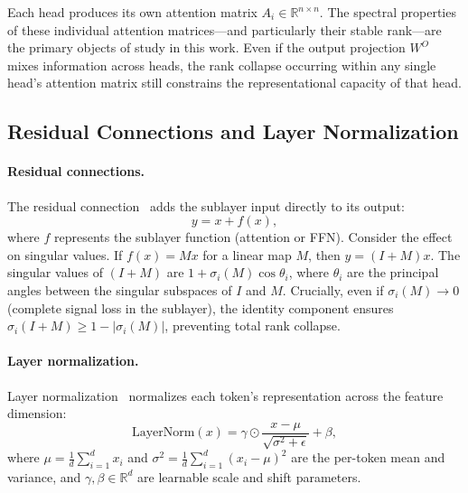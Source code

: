 \documentclass[12pt, a4paper]{article}
\begin{document}
Each head produces its own attention matrix $A_i \in
\mathbb{R}^{n \times n}$. The spectral properties of these individual
attention matrices---and particularly their stable rank---are the primary
objects of study in this work. Even if the output projection $W^O$ mixes
information across heads, the rank collapse occurring within any single
head's attention matrix still constrains the representational capacity of
that head.

\subsection{Residual Connections and Layer Normalization}

\paragraph{Residual connections.}
The residual connection~\cite{he2016residual} adds the sublayer input
directly to its output:
\begin{equation}
    y = x + f(x),
    \label{eq:residual}
\end{equation}
where $f$ represents the sublayer function (attention or FFN). Consider
the effect on singular values. If $f(x) = Mx$ for a linear map $M$,
then $y = (I + M)x$. The singular values of $(I + M)$ are
$1 + \sigma_i(M) \cos\theta_i$, where $\theta_i$ are the principal
angles between the singular subspaces of $I$ and $M$. Crucially, even if
$\sigma_i(M) \to 0$ (complete signal loss in the sublayer), the
identity component ensures $\sigma_i(I + M) \geq 1 - |\sigma_i(M)|$,
preventing total rank collapse.

\paragraph{Layer normalization.}
Layer normalization~\cite{ba2016layernorm} normalizes each token's
representation across the feature dimension:
\begin{equation}
    \text{LayerNorm}(x) = \gamma \odot \frac{x - \mu}{\sqrt{\sigma^2 + \epsilon}} + \beta,
    \label{eq:layernorm}
\end{equation}
where $\mu = \frac{1}{d}\sum_{i=1}^d x_i$ and $\sigma^2 =
\frac{1}{d}\sum_{i=1}^d (x_i - \mu)^2$ are the per-token mean and
variance, and $\gamma, \beta \in \mathbb{R}^d$ are learnable scale and
shift parameters.
\end{document}
